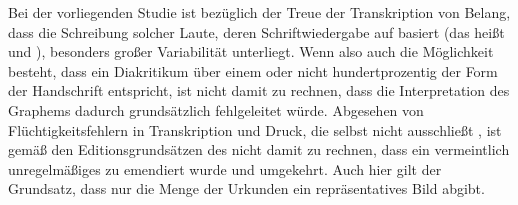 % 
% 
Bei der vorliegenden Studie ist bezüglich der Treue der Transkription von
Belang, dass die Schreibung solcher Laute, deren Schriftwiedergabe auf 
basiert (das heißt %
 und %
), besonders großer Variabilität unterliegt. Wenn also auch die Möglichkeit
besteht, dass ein Diakritikum über einem  oder  nicht
hundertprozentig der Form der Handschrift entspricht, ist nicht damit zu
rechnen, dass die Interpretation des Graphems dadurch grundsätzlich
fehlgeleitet würde. Abgesehen von %
Flüchtigkeitsfehlern in Transkription und Druck, die selbst
\citeauthor{wilhelm1932} nicht ausschließt \autocites[\RN{60},
\RN{78}]{wilhelm1932}, ist gemäß den Editionsgrundsätzen des \CAO{}
nicht damit zu rechnen, dass ein vermeintlich unregelmäßiges  zu
 emendiert wurde und umgekehrt. Auch hier gilt der Grundsatz, dass nur
die Menge der Urkunden ein repräsentatives Bild abgibt.

